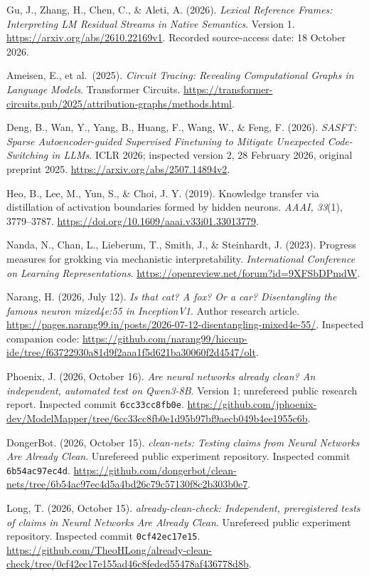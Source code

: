 \documentclass[
  british,
  11pt,
  a4paper,
]{article}
\begin{document}
Gu, J., Zhang, H., Chen, C., \& Aleti, A. (2026). \emph{Lexical
Reference Frames: Interpreting LM Residual Streams in Native Semantics}.
Version 1. \url{https://arxiv.org/abs/2610.22169v1}. Recorded
source-access date: 18 October 2026.

Ameisen, E., et al.~(2025). \emph{Circuit Tracing: Revealing
Computational Graphs in Language Models}. Transformer Circuits.
\url{https://transformer-circuits.pub/2025/attribution-graphs/methods.html}.

Deng, B., Wan, Y., Yang, B., Huang, F., Wang, W., \& Feng, F. (2026).
\emph{SASFT: Sparse Autoencoder-guided Supervised Finetuning to Mitigate
Unexpected Code-Switching in LLMs}. ICLR 2026; inspected version 2, 28
February 2026, original preprint 2025.
\url{https://arxiv.org/abs/2507.14894v2}.

Heo, B., Lee, M., Yun, S., \& Choi, J. Y. (2019). Knowledge transfer via
distillation of activation boundaries formed by hidden neurons.
\emph{AAAI, 33}(1), 3779--3787.
\url{https://doi.org/10.1609/aaai.v33i01.33013779}.

Nanda, N., Chan, L., Lieberum, T., Smith, J., \& Steinhardt, J. (2023).
Progress measures for grokking via mechanistic interpretability.
\emph{International Conference on Learning Representations}.
\url{https://openreview.net/forum?id=9XFSbDPmdW}.

Narang, H. (2026, July 12). \emph{Is that cat? A fox? Or a car?
Disentangling the famous neuron mixed4e:55 in InceptionV1}. Author
research article.
\url{https://pages.narang99.in/posts/2026-07-12-disentangling-mixed4e-55/}.
Inspected companion code:
\url{https://github.com/narang99/hiccup-ide/tree/f63722930a81d9f2aaa1f5d621ba30060f2d4547/olt}.

Phoenix, J. (2026, October 16). \emph{Are neural networks already clean?
An independent, automated test on Qwen3-8B}. Version 1; unrefereed
public research report. Inspected commit \texttt{6cc33cc8fb0e}.
\url{https://github.com/jphoenix-dev/ModelMapper/tree/6cc33cc8fb0e1d95b97bf9aecb049b4ee1955c6b}.

DongerBot. (2026, October 15). \emph{clean-nets: Testing claims from
Neural Networks Are Already Clean}. Unrefereed public experiment
repository. Inspected commit \texttt{6b54ac97ec4d}.
\url{https://github.com/dongerbot/clean-nets/tree/6b54ac97ec4d5a4bd26c79c57130f8c2b303b0e7}.

Long, T. (2026, October 15). \emph{already-clean-check: Independent,
preregistered tests of claims in Neural Networks Are Already Clean}.
Unrefereed public experiment repository. Inspected commit
\texttt{0cf42ec17e15}.
\url{https://github.com/TheoHLong/already-clean-check/tree/0cf42ec17e155ad46c8feded55478af436778d8b}.
\end{document}

